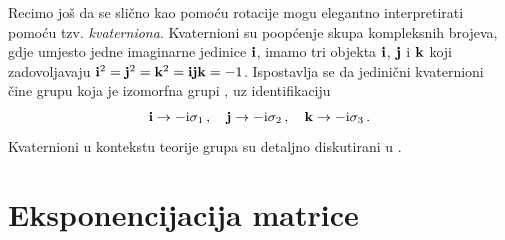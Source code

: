Recimo još da se slično kao pomoću  rotacije mogu elegantno
interpretirati pomoću tzv. \emph{kvaterniona}.  Kvaternioni su poopćenje 
skupa kompleksnih brojeva, gdje umjesto jedne imaginarne jedinice $\vec{{\rm i}}$,
imamo tri objekta $\vec{{\rm i}}$, $\vec{{\rm j}}$ i $\vec{{\rm k}}$ koji zadovoljavaju
$\vec{{\rm i}}^2 = \vec{{\rm j}}^2 = \vec{{\rm k}}^2 = \vec{{\rm i}}\vec{{\rm j}}\vec{{\rm k}} = -1$. 
Ispostavlja se da jedinični kvaternioni čine grupu koja
je izomorfna grupi , uz identifikaciju
\begin{equation}
    \vec{{\rm i}} \to -\rmi \sigma_1\,, \quad
    \vec{{\rm j}} \to -\rmi \sigma_2\,, \quad
    \vec{{\rm k}} \to -\rmi \sigma_3\,.
\end{equation}
Kvaternioni u kontekstu teorije grupa su detaljno diskutirani u \cite{Stilwell:2008}.

\chapter{Eksponencijacija matrice}
\label{sec:expmat}


